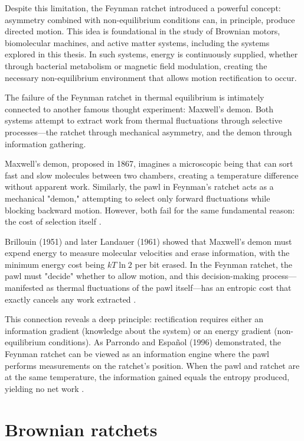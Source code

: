 Despite this limitation, the Feynman ratchet introduced a powerful concept: asymmetry combined with non-equilibrium conditions can, in principle, produce directed motion. This idea is foundational in the study of Brownian motors, biomolecular machines, and active matter systems, including the systems explored in this thesis. In such systems, energy is continuously supplied, whether through bacterial metabolism or magnetic field modulation, creating the necessary non-equilibrium environment that allows motion rectification to occur.

The failure of the Feynman ratchet in thermal equilibrium is intimately connected to another famous thought experiment: Maxwell's demon. Both systems attempt to extract work from thermal fluctuations through selective processes—the ratchet through mechanical asymmetry, and the demon through information gathering.

Maxwell's demon, proposed in 1867, imagines a microscopic being that can sort fast and slow molecules between two chambers, creating a temperature difference without apparent work. Similarly, the pawl in Feynman's ratchet acts as a mechanical "demon," attempting to select only forward fluctuations while blocking backward motion. However, both fail for the same fundamental reason: the cost of selection itself \cite{maxwell1871theory, maxwell1867letter}.

Brillouin (1951) and later Landauer (1961) showed that Maxwell's demon must expend energy to measure molecular velocities and erase information, with the minimum energy cost being $kT\ln{2}$ per bit erased. In the Feynman ratchet, the pawl must "decide" whether to allow motion, and this decision-making process—manifested as thermal fluctuations of the pawl itself—has an entropic cost that exactly cancels any work extracted \cite{brillouin1951maxwell, landauer1961irreversibility}.

This connection reveals a deep principle: rectification requires either an information gradient (knowledge about the system) or an energy gradient (non-equilibrium conditions). As Parrondo and Español (1996) demonstrated, the Feynman ratchet can be viewed as an information engine where the pawl performs measurements on the ratchet's position. When the pawl and ratchet are at the same temperature, the information gained equals the entropy produced, yielding no net work \cite{parrondo1996criticism}.


\section{Brownian ratchets}
\label{sct:brownianratchets}

